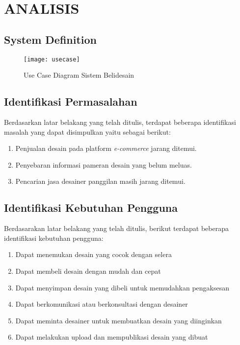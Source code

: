 \chapter{ANALISIS}
\section{System Definition}
\begin{figure}[h]
	\centering
	\texttt{[image: usecase]}
	\caption{Use Case Diagram Sistem Belidesain}
\end{figure}

\section{Identifikasi Permasalahan}
Berdasarkan latar belakang yang telah ditulis, terdapat beberapa identifikasi masalah yang dapat disimpulkan yaitu sebagai berikut:
\begin{enumerate}
	\item Penjualan desain pada platform \textit{e-commerce} jarang ditemui.
	\item Penyebaran informasi pameran desain yang belum meluas.
	\item Pencarian jasa desainer panggilan masih jarang ditemui.
\end{enumerate}

\section{Identifikasi Kebutuhan Pengguna}
Berdasarakan latar belakang yang telah ditulis, berikut terdapat beberapa identifikasi kebutuhan pengguna:
\begin{enumerate}
	\item Dapat menemukan desain yang cocok dengan selera
	\item Dapat membeli desain dengan mudah dan cepat
	\item Dapat menyimpan desain yang dibeli untuk memudahkan pengaksesan
	\item Dapat berkomunikasi atau berkonsultasi dengan desainer
	\item Dapat meminta desainer untuk membuatkan desain yang diinginkan
	\item Dapat melakukan upload dan mempublikasi desain yang dibuat
\end{enumerate}
